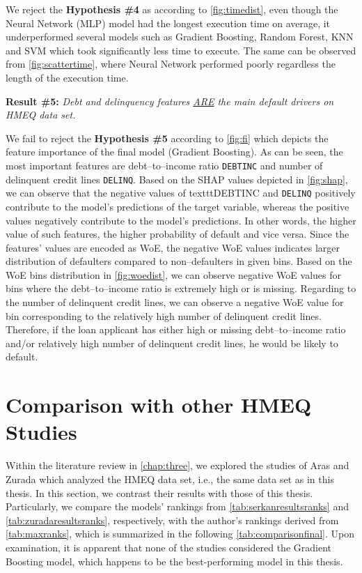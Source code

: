We reject the \textbf{Hypothesis \#4} as according to \autoref{fig:timedist}, even though the Neural Network (MLP) model had the longest execution time on average, it underperformed several models such as Gradient Boosting, Random Forest, KNN and SVM which took significantly less time to execute. The same can be observed from \autoref{fig:scattertime}, where Neural Network performed poorly regardless the length of the execution time.
\vspace{0.3cm}

\noindent \textbf{Result \#5:} \textit{Debt and delinquency features \underline{ARE} the main default drivers on HMEQ data set.}

We fail to reject the \textbf{Hypothesis \#5} according to \autoref{fig:fi} which depicts the feature importance of the final model (Gradient Boosting). As can be seen, the most important features are debt--to--income ratio \texttt{DEBTINC} and number of delinquent credit lines \texttt{DELINQ}.
Based on the SHAP values depicted in \autoref{fig:shap}, we can observe that the negative values of texttt{DEBTINC} and \texttt{DELINQ} positively contribute to the model's predictions of the target variable, whereas the positive values negatively contribute to the model's predictions.
In other words, the higher value of such features, the higher probability of default and vice versa.
Since the features' values are encoded as WoE, the negative WoE values indicates larger distribution of defaulters compared to non--defaulters in given bins.
Based on the WoE bins distribution in \autoref{fig:woedist}, we can observe negative WoE values for bins where the debt--to--income ratio is extremely high or is missing. Regarding to the number of delinquent credit lines, we can observe a negative WoE value for bin corresponding to the relatively high number of delinquent credit lines.
Therefore, if the loan applicant has either high or missing debt--to--income ratio and/or relatively high number of delinquent credit lines,  he would be likely to default.

\newpage
\section{Comparison with other HMEQ Studies}
\label{sec:comparisonfinal}
Within the literature review in \autoref{chap:three}, we explored the studies of Aras \citep{serkan2021bagging} and Zurada \citep{zurada2014classification} which analyzed the HMEQ data set, i.e., the same data set as in this thesis.
In this section, we contrast their results with those of this thesis. Particularly, we compare the models' rankings from \autoref{tab:serkanresultsranks} and \autoref{tab:zuradaresultsranks}, respectively, with the author's rankings derived from \autoref{tab:maxranks}, which is summarized in the following \autoref{tab:comparisonfinal}.
Upon examination, it is apparent that none of the studies considered the Gradient Boosting model, which happens to be the best-performing model in this thesis.

